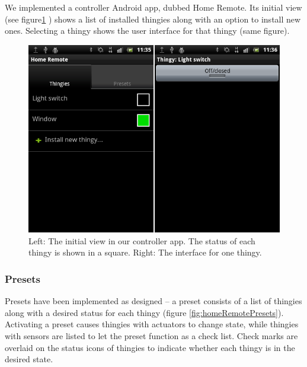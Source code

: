\documentclass{ubicomp2012}
\begin{document}
We implemented a controller Android app, dubbed Home Remote. Its initial view (see figure\ref{fig:homeRemoteHomeView} ) shows a list of installed thingies along with an option to install new ones. Selecting a thingy shows the user interface for that thingy (same figure).

\begin{figure}[th]
\begin{center}
\includegraphics[width=0.90\columnwidth]{figures/home-remote-thingies+1.png}
\end{center}
\caption{Left: The initial view in our controller app. The status of each thingy is shown in a square. Right: The interface for one thingy.}
\label{fig:homeRemoteHomeView}
\end{figure}

\subsubsection{Presets}

Presets have been implemented as designed -- a preset consists of a list of thingies along with a desired status for each thingy (figure \ref{fig:homeRemotePresets}). Activating a preset causes thingies with actuators to change state, while thingies with sensors are listed to let the preset function as a check list. Check marks are overlaid on the status icons of thingies to indicate whether each thingy is in the desired state.
\end{document}
